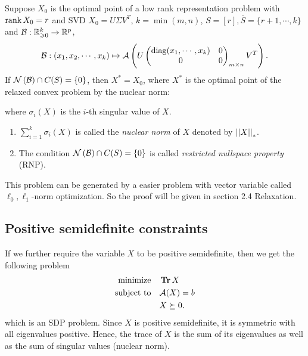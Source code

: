 \documentclass[11pt]{article}
\begin{document}
\begin{theorem}\label{thm:relaxation}
    Suppose \(X_0\) is the optimal point of a low rank representation problem with \(\operatorname{rank} X_0=r\) and SVD \(X_0 = U\Sigma V^T\), \(k=\min(m,n)\), \(S=[r],\bar{S}=\{r+1,\cdots ,k\}\) and \(\mathcal{B}:\mathbb R^k_{\geqslant 0} \to \mathbb R^p\),
    \[\mathcal{B}:(x_1,x_2,\cdots,x_k) \mapsto \mathcal{A}\left( U \begin{pmatrix}
        \operatorname{diag}(x_1,\cdots,x_k) & 0 \\
        0 & 0
    \end{pmatrix}_{m\times n} V^T\right).\]
    If \(\mathcal N\left(\mathcal{B}\right)\cap C(S) = \{0\}\), then \(X^\ast=X_0\), where \(X^\ast\) is the optimal point of the relaxed convex problem by the nuclear norm: 

    where \(\sigma_i(X)\) is the \(i\)-th singular value of \(X\).
\end{theorem}

\begin{remark}
    \begin{enumerate}[(1)]
        \item \(\sum_{i=1}^{k} \sigma_i(X)\) is called the \emph{nuclear norm} of \(X\) denoted by \(\left|\left|X\right|\right|_\ast\).
        \item The condition \(\mathcal N\left(\mathcal{B}\right)\cap C(S) = \{0\}\) is called \emph{restricted nullspace property} (RNP).
    \end{enumerate}
\end{remark}

This problem can be generated by a easier problem with vector variable called \(\ell_0,\ell_1\)-norm optimization. So the proof will be given in section 2.4 Relaxation.

\subsection{Positive semidefinite constraints}

If we further require the variable \(X\) to be positive semidefinite, then we get the following problem 
\[\begin{aligned}
    \textnormal{minimize}\quad & \operatorname{\mathbf{Tr}} X\\
    \textnormal{subject to}\quad & \mathcal A(X)=b\\
    & X\succeq 0.
\end{aligned}\]
which is an SDP problem. Since \(X\) is positive semidefinite, it is symmetric with all eigenvalues positive. Hence, the trace of \(X\) is the sum of its eigenvalues as well as the sum of singular values (nuclear norm).
\end{document}
